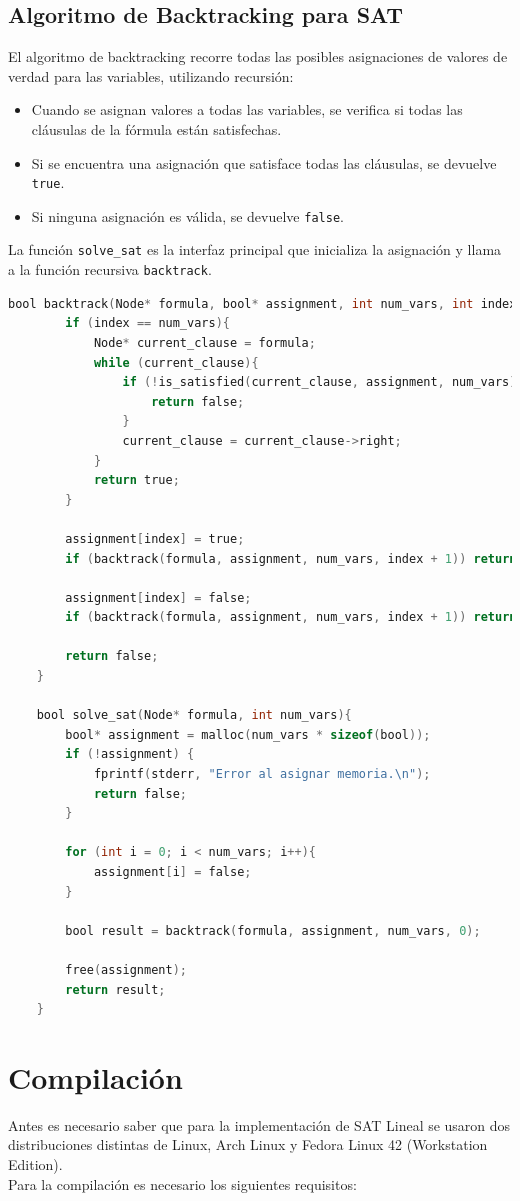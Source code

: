 \documentclass{report}
\begin{document}
	\subsection{Algoritmo de Backtracking para SAT}

	El algoritmo de backtracking recorre todas las posibles asignaciones de valores de verdad para las variables, utilizando recursión:

	\begin{itemize}
		\item Cuando se asignan valores a todas las variables, se verifica si todas las cláusulas de la fórmula están satisfechas.
		\item Si se encuentra una asignación que satisface todas las cláusulas, se devuelve \texttt{true}.
		\item Si ninguna asignación es válida, se devuelve \texttt{false}.
	\end{itemize}

	La función \texttt{solve\_sat} es la interfaz principal que inicializa la asignación y llama a la función recursiva \texttt{backtrack}.

	\begin{lstlisting}[language=C, caption={Backtracking para resolver SAT}]
	bool backtrack(Node* formula, bool* assignment, int num_vars, int index){
		if (index == num_vars){
			Node* current_clause = formula;
			while (current_clause){
				if (!is_satisfied(current_clause, assignment, num_vars)){
					return false;
				}
				current_clause = current_clause->right;
			}
			return true;
		}

		assignment[index] = true;
		if (backtrack(formula, assignment, num_vars, index + 1)) return true;

		assignment[index] = false;
		if (backtrack(formula, assignment, num_vars, index + 1)) return true;

		return false;
	}

	bool solve_sat(Node* formula, int num_vars){
		bool* assignment = malloc(num_vars * sizeof(bool));
		if (!assignment) {
			fprintf(stderr, "Error al asignar memoria.\n");
			return false;
		}

		for (int i = 0; i < num_vars; i++){
			assignment[i] = false;
		}

		bool result = backtrack(formula, assignment, num_vars, 0);

		free(assignment);
		return result;
	}
	\end{lstlisting}

	\newpage
	\section{Compilaci\'on}
	Antes es necesario saber que para la implementaci\'on de SAT Lineal se usaron dos distribuciones distintas de Linux, Arch Linux y Fedora Linux 42 (Workstation Edition). \\
	Para la compilaci\'on es necesario los siguientes requisitos:
\end{document}
